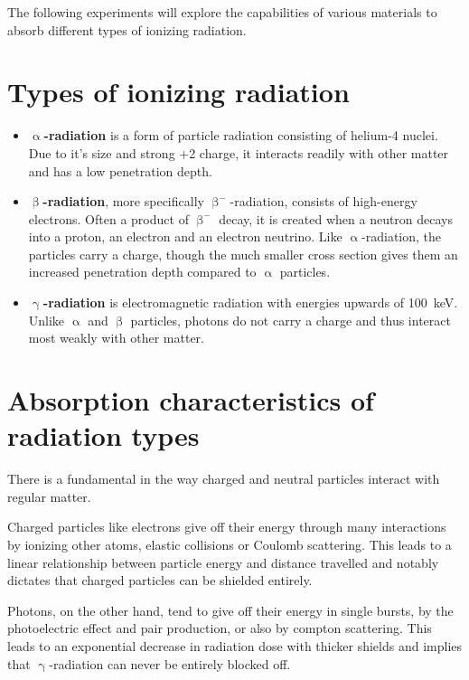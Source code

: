 
The following experiments will explore the capabilities of various materials to absorb different types of ionizing radiation.

\section{Types of ionizing radiation}
\begin{itemize}
	\item \textbf{$\upalpha$-radiation} is a form of particle radiation consisting of helium-4 nuclei.
	Due to it's size and strong +2 charge, it interacts readily with other matter and has a low penetration depth.
	\item \textbf{$\upbeta$-radiation}, more specifically $\upbeta^{-}$-radiation, consists of high-energy electrons.
	Often a product of $\upbeta^{-}$ decay, it is created when a neutron decays into a proton, an electron and an electron neutrino.
	Like $\upalpha$-radiation, the particles carry a charge, though the much smaller cross section gives them an increased penetration depth compared to $\upalpha$ particles.
	\item \textbf{$\upgamma$-radiation} is electromagnetic radiation with energies upwards of \SI{100}{\kilo\electronvolt}.
	Unlike $\upalpha$ and $\upbeta$ particles, photons do not carry a charge and thus interact most weakly with other matter.
\end{itemize}

\section{Absorption characteristics of radiation types}
There is a fundamental in the way charged and neutral particles interact with regular matter.

Charged particles like electrons give off their energy through many interactions by ionizing other atoms, elastic collisions or Coulomb scattering.
This leads to a linear relationship between particle energy and distance travelled and notably dictates that charged particles can be shielded entirely.

Photons, on the other hand, tend to give off their energy in single bursts, by the photoelectric effect and pair production, or also by compton scattering.
This leads to an exponential decrease in radiation dose with thicker shields and implies that $\upgamma$-radiation can never be entirely blocked off.

